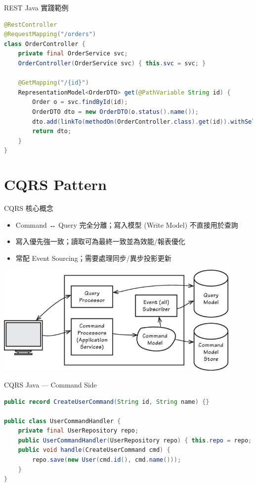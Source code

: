 \documentclass[UTF8]{beamer}
\begin{document}
\begin{frame}[fragile]{REST Java 實踐範例}
    \begin{lstlisting}[language=Java]
@RestController
@RequestMapping("/orders")
class OrderController {
    private final OrderService svc;
    OrderController(OrderService svc) { this.svc = svc; }

    @GetMapping("/{id}")
    RepresentationModel<OrderDTO> get(@PathVariable String id) {
        Order o = svc.findById(id);
        OrderDTO dto = new OrderDTO(o.status().name());
        dto.add(linkTo(methodOn(OrderController.class).get(id)).withSelfRel());
        return dto;
    }
}
    \end{lstlisting}
\end{frame}



\section{CQRS Pattern}
\begin{frame}{CQRS 核心概念}
    \begin{itemize}
        \item Command ↔ Query 完全分離；寫入模型 (Write Model) 不直接用於查詢
        \item 寫入優先強一致；讀取可為最終一致並為效能/報表優化
        \item 常配 Event Sourcing；需要處理同步/異步投影更新
    \end{itemize}
    \begin{center}
        \includegraphics[width=0.9\textwidth]{img/cqrs-diagram.png}
    \end{center}
\end{frame}

\begin{frame}[fragile]{CQRS Java — Command Side}
    \begin{lstlisting}[language=Java]
public record CreateUserCommand(String id, String name) {}

public class UserCommandHandler {
    private final UserRepository repo;
    public UserCommandHandler(UserRepository repo) { this.repo = repo; }
    public void handle(CreateUserCommand cmd) {
        repo.save(new User(cmd.id(), cmd.name()));
    }
}
\end{lstlisting}
\end{frame}
\end{document}
